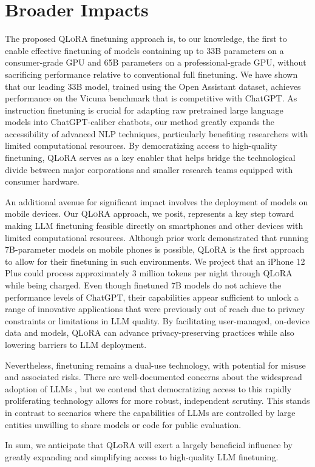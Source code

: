 \section{Broader Impacts}

The proposed \textsc{QLoRA} finetuning approach is, to our knowledge, the first to enable effective finetuning of models containing up to 33B parameters on a consumer-grade GPU and 65B parameters on a professional-grade GPU, without sacrificing performance relative to conventional full finetuning. We have shown that our leading 33B model, trained using the Open Assistant dataset, achieves performance on the Vicuna benchmark that is competitive with ChatGPT. As instruction finetuning is crucial for adapting raw pretrained large language models into ChatGPT-caliber chatbots, our method greatly expands the accessibility of advanced NLP techniques, particularly benefiting researchers with limited computational resources. By democratizing access to high-quality finetuning, \textsc{QLoRA} serves as a key enabler that helps bridge the technological divide between major corporations and smaller research teams equipped with consumer hardware.

An additional avenue for significant impact involves the deployment of models on mobile devices. Our \textsc{QLoRA} approach, we posit, represents a key step toward making LLM finetuning feasible directly on smartphones and other devices with limited computational resources. Although prior work demonstrated that running 7B-parameter models on mobile phones is possible, \textsc{QLoRA} is the first approach to allow for their finetuning in such environments. We project that an iPhone 12 Plus could process approximately 3 million tokens per night through \textsc{QLoRA} while being charged. Even though finetuned 7B models do not achieve the performance levels of ChatGPT, their capabilities appear sufficient to unlock a range of innovative applications that were previously out of reach due to privacy constraints or limitations in LLM quality. By facilitating user-managed, on-device data and models, \textsc{QLoRA} can advance privacy-preserving practices while also lowering barriers to LLM deployment.

Nevertheless, finetuning remains a dual-use technology, with potential for misuse and associated risks. There are well-documented concerns about the widespread adoption of LLMs \citep{bommasani2021opportunities,bender2021dangers}, but we contend that democratizing access to this rapidly proliferating technology allows for more robust, independent scrutiny. This stands in contrast to scenarios where the capabilities of LLMs are controlled by large entities unwilling to share models or code for public evaluation.

In sum, we anticipate that \textsc{QLoRA} will exert a largely beneficial influence by greatly expanding and simplifying access to high-quality LLM finetuning.